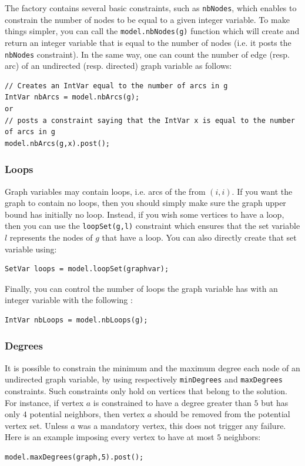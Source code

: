 \documentclass{article}
\begin{document}
The factory contains several basic constraints, such as \texttt{nbNodes}, which enables to constrain the number of nodes to be equal to a given integer variable. 
To make things simpler, you can call the \texttt{model.nbNodes(g)} function which will create and return an integer variable that is equal to the number of nodes (i.e. it posts the \texttt{nbNodes} constraint). 
In the same way, one can count the number of edge (resp. arc) of an undirected (resp. directed) graph variable as follows: 
\begin{lstlisting}
// Creates an IntVar equal to the number of arcs in g
IntVar nbArcs = model.nbArcs(g);
or
// posts a constraint saying that the IntVar x is equal to the number of arcs in g
model.nbArcs(g,x).post(); 
\end{lstlisting}  

\subsubsection{Loops}

Graph variables may contain loops, i.e. arcs of the from $(i,i)$. If you want the graph to contain no loops, then you should simply make sure the graph upper bound has initially no loop. Instead, if you wish some vertices to have a loop, then you can use the \texttt{loopSet(g,l)} constraint which ensures that the set variable $l$ represents the nodes of $g$ that have a loop. You can also directly create that set variable using:
\begin{lstlisting}
SetVar loops = model.loopSet(graphvar);
\end{lstlisting} 

Finally, you can control the number of loops the graph variable has with an integer variable with the following : 
\begin{lstlisting}
IntVar nbLoops = model.nbLoops(g);
\end{lstlisting} 

\subsubsection{Degrees}

It is possible to constrain the minimum and the maximum degree each node of an undirected graph variable, by using respectively \texttt{minDegrees} and \texttt{maxDegrees} constraints. 
Such constraints only hold on vertices that belong to the solution. For instance, if vertex $a$ is constrained to have a degree greater than $5$ but has only $4$ potential neighbors, then vertex $a$ should be removed from the potential vertex set. Unless $a$ was a mandatory vertex, this does not trigger any failure. Here is an example imposing every vertex to have at most $5$ neighbors: 
\begin{lstlisting}
model.maxDegrees(graph,5).post();
\end{lstlisting}
\end{document}
